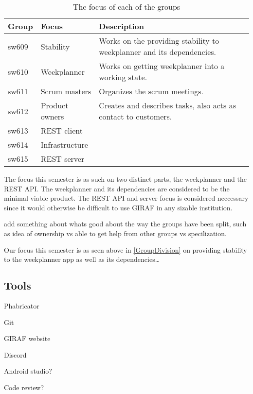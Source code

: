 \begin{table}[H]
\centering
\begin{tabular}{|l|l|l|}
\hline
Group & Focus & Description \\ \hline
sw609 & Stability & Works on the providing stability to weekplanner and its
dependencies.\\\hline 
sw610 & Weekplanner & Works on getting weekplanner into a working
state.\\
\hline sw611 & Scrum masters & Organizes the scrum meetings. \\\hline 
sw612 & Product owners & Creates and describes tasks, also acts as contact to
customers. \\\hline 
sw613 & REST client & \\ \hline

sw614 & Infrastructure & \\ \hline

sw615 & REST server & \\ \hline

\end{tabular}
\caption{The focus of each of the groups}
\label{GroupDivision}
\end{table}

The focus this semester is as such on two distinct parts, the weekplanner and
the REST API. The weekplanner and its dependencies are considered to be the
minimal viable product. The REST API and server focus is considered neccessary
since it would otherwise be difficult to use GIRAF in any sizable institution.

add something about whats good about the way the groups have been split, such as
idea of ownership vs able to get help from other groups vs specilization.

Our focus this semester is as seen above in \autoref{GroupDivision} on providing
stability to the weekplanner app as well as its dependencies\ldots



 
\subsection{Tools}

Phabricator

Git

GIRAF website

Discord

Android studio?

Code review?

